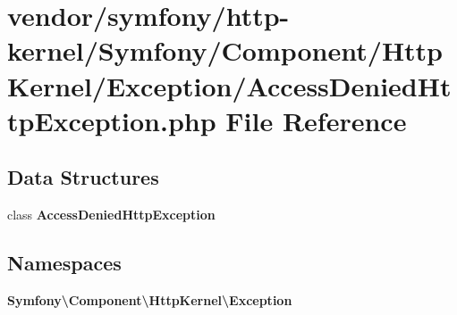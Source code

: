 \section{vendor/symfony/http-\/kernel/\+Symfony/\+Component/\+Http\+Kernel/\+Exception/\+Access\+Denied\+Http\+Exception.php File Reference}
\label{_access_denied_http_exception_8php}
\subsection*{Data Structures}
\begin{DoxyCompactItemize}
\item 
class {\bf Access\+Denied\+Http\+Exception}
\end{DoxyCompactItemize}
\subsection*{Namespaces}
\begin{DoxyCompactItemize}
\item 
 {\bf Symfony\textbackslash{}\+Component\textbackslash{}\+Http\+Kernel\textbackslash{}\+Exception}
\end{DoxyCompactItemize}
